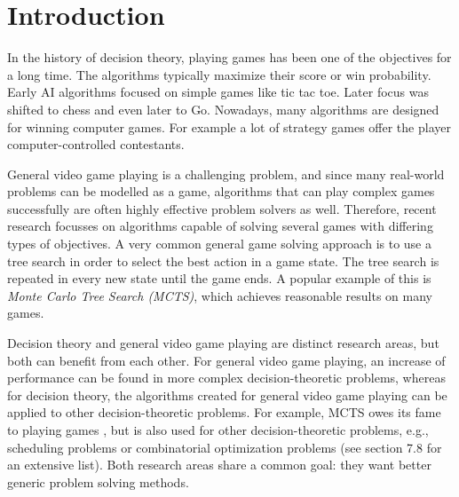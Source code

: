 \chapter{Introduction}
\label{sec:introduction}






In the history of decision theory, playing games has been one of the objectives
for a long time. The algorithms typically maximize their score or win
probability. Early AI algorithms focused on simple games like tic tac toe.
Later focus was shifted to chess and even later to Go. Nowadays, many algorithms
are designed for winning computer games. For example a lot of strategy games
offer the player computer-controlled contestants. 

General video game playing is a challenging problem, and since many real-world
problems can be modelled as a game, algorithms that can play complex games
successfully are often highly effective problem solvers as well.
Therefore, recent research focusses on algorithms capable of solving several
games with differing types of objectives. A very common general game solving
approach is to use a tree search in order to select the best action in a game
state. The tree search is repeated in every new state until the game ends. A
popular example of this is \emph{Monte Carlo Tree Search (MCTS)}, which achieves
reasonable results on many games.

Decision theory and general video game playing are distinct research areas, but
both can benefit from each other. For general video game playing, an increase of
performance can be found in more complex decision-theoretic problems, whereas
for decision theory, the algorithms created for general video game playing can
be applied to other decision-theoretic problems. For example, MCTS owes its fame
to playing games \cite{gelly2006modification}, but is also used for other
decision-theoretic problems, e.g., scheduling problems or combinatorial
optimization problems (see \cite{browne2012survey} section 7.8 for an extensive
list). Both research areas share a common goal: they want better generic problem
solving methods.

